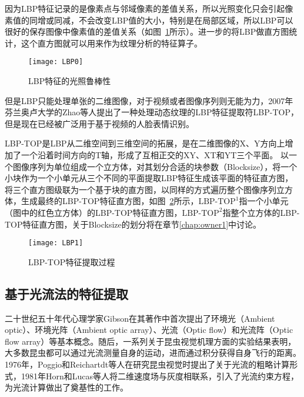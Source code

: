 因为LBP特征记录的是像素点与邻域像素的差值关系，所以光照变化只会引起像素值的同增或同减，不会改变LBP值的大小，特别是在局部区域，所以LBP可以很好的保存图像中像素值的差值关系（如图~\ref{fig5}所示）。进一步的将LBP做直方图统计，这个直方图就可以用来作为纹理分析的特征算子。

\begin{figure}[!htbp]
    \centering
    \texttt{[image: LBP0]}
    \caption{LBP特征的光照鲁棒性}
    \label{fig5}
\end{figure}

但是LBP只能处理单张的二维图像，对于视频或者图像序列则无能为力，2007年芬兰奥卢大学的Zhao等人提出了一种处理动态纹理的LBP特征提取符LBP-TOP，但是现在已经被广泛用于基于视频的人脸表情识别\citep{zhao2007dynamic}。

LBP-TOP是LBP从二维空间到三维空间的拓展，是在二维图像的X、Y方向上增加了一个沿着时间方向的T轴，形成了互相正交的XY、XT和YT三个平面。 以一个图像序列为单位组成一个立方体，对其划分合适的块参数（Blocksize），将一个小块作为一个小单元从三个不同的平面提取LBP特征生成该平面的特征直方图，将三个直方图级联为一个基于块的直方图，以同样的方式遍历整个图像序列立方体，生成最终的LBP-TOP特征直方图，如图~\ref{fig6}所示，$\textrm{LBP-TOP}^{1}$指一个小单元（图中的红色立方体）的LBP-TOP特征直方图，$\textrm{LBP-TOP}^{2}$指整个立方体的LBP-TOP特征直方图，关于Blocksize的划分将在章节\ref{chap:owner1}中讨论。

\begin{figure}[!htbp]
    \centering
    \texttt{[image: LBP1]}
    \caption{LBP-TOP特征提取过程}
    \label{fig6}
\end{figure}

\subsection{基于光流法的特征提取}

二十世纪五十年代心理学家Gibson在其著作中首次提出了环境光（Ambient optic）、环境光阵（Ambient optic array）、光流（Optic flow）和光流阵（Optic flow array）等基本概念。随后，一系列关于昆虫视觉机理方面的实验结果表明，大多数昆虫都可以通过光流测量自身的运动，进而通过积分获得自身飞行的距离。1976年，Poggio和Reichartdt等人在研究昆虫视觉时提出了关于光流的粗略计算形式\citep{poggio1976visual}，1981年Horn和Lucas等人将二维速度场与灰度相联系，引入了光流约束方程，为光流计算做出了奠基性的工作\citep{Lucas1981, HORN1981185}。

